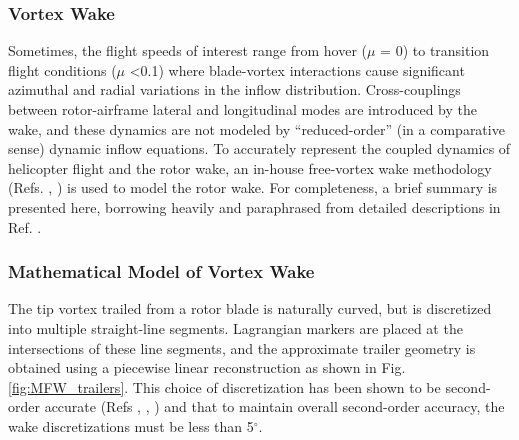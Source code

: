 \subsubsection{Vortex Wake}
Sometimes, the flight speeds of interest range from hover ($\mu$ = 0) to transition flight conditions ($\mu$ \textless 0.1) where blade-vortex interactions cause significant azimuthal and radial variations in the inflow distribution. Cross-couplings between rotor-airframe lateral and longitudinal modes are introduced by the wake, and these dynamics are not modeled by ``reduced-order'' (in a comparative sense) dynamic inflow equations. To accurately represent the coupled dynamics of helicopter flight and the rotor wake, an in-house free-vortex wake methodology (Refs. \cite{Bhagwat}, \cite{Ananthan}) is used to model the rotor wake. For completeness, a brief summary is presented here, borrowing heavily and paraphrased from detailed descriptions in Ref. \cite{Ananthan}.  

\subsubsection*{Mathematical Model of Vortex Wake}


The tip vortex trailed from a rotor blade is naturally curved, but is discretized into multiple straight-line segments. Lagrangian markers are placed at the intersections of these line segments, and the approximate trailer geometry is obtained using a piecewise linear reconstruction as shown in Fig. \ref{fig:MFW_trailers}. This choice of discretization has been shown to be second-order accurate (Refs \cite{Bhagwat}, \cite{Wachspress}, \cite{Gupta}) and that to maintain overall second-order accuracy, the wake discretizations must be less than 5$^\circ$. 

